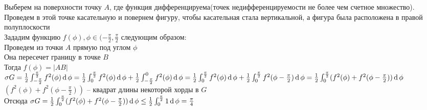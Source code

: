 \documentclass[12pt]{article}
\begin{document}
Выберем на поверхности точку $A$, где функция дифференцируема(точек недифференцируемости не более чем счетное множество). Проведем в этой точке касательную и повернем фигуру, чтобы касательная стала вертикальной, а фигура была расположена в правой полуплоскости\\
Зададим функцию $f(\phi), \phi \in (-\frac\pi2, \frac\pi2$ следующим образом:\\
Проведем из точки $A$ прямую под углом $\phi$\\
Она пересечет границу в точке $B$\\
Тогда $f(\phi) = |AB|$\\
$\sigma G = \frac12 \int_{-\frac\pi2}^{\frac\pi2} f^2(\phi)\operatorname{d} \phi = \frac12 \int_0^{\frac\pi2} f^2(\phi)\operatorname{d} \phi + \frac12 \int_{-\frac\pi2}^0 f^2(\phi)\operatorname{d} \phi = \frac12 \int_0^{\frac\pi2} f^2(\phi)\operatorname{d} \phi + \frac12 \int_0^{\frac\pi2} f^2(\phi-\frac\pi2)\operatorname{d} \phi = \frac12 \int_0^{\frac\pi2} (f^2(\phi)+f^2(\phi-\frac\pi2)) \operatorname{d} \phi$\\
$(f^2(\phi)+f^2(\phi-\frac\pi2))$ -- квадрат длины некоторой хорды в $G$\\
Отсюда $\sigma G = \frac12 \int_0^{\frac\pi2} (f^2(\phi)+f^2(\phi-\frac\pi2)) \operatorname{d} \phi \leq \frac12 \int_0^{\frac\pi2} 1 \operatorname{d} \phi = \frac\pi4$
\end{document}
